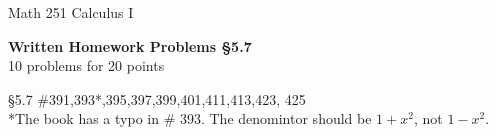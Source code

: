 \documentclass[11pt]{report}
\theoremstyle{plain}
\begin{document}
\hfill Math 251 Calculus I
\begin{center}
\Large{\textbf{Written Homework Problems \S 5.7}} \\
10 problems for 20 points\\
\end{center}

{\S 5.7} \#391,393*,395,397,399,401,411,413,423, 425\\

*The book has a typo in \# 393. The denomintor should be $1+x^2$, not $1-x^2.$
\end{document}

